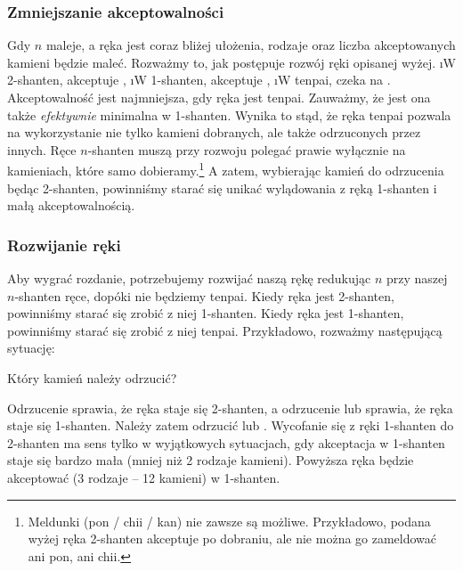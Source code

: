 \subsubsection{Zmniejszanie akceptowalności}
Gdy $n$ maleje, a ręka jest coraz bliżej ułożenia, rodzaje oraz liczba akceptowanych kamieni będzie maleć.
Rozważmy to, jak postępuje rozwój ręki opisanej wyżej.
\bi
\i W 2-{\jap shanten}, akceptuje ,
\i W 1-{\jap shanten}, akceptuje ,
\i W {\jap tenpai}, czeka na .
\ei
Akceptowalność jest najmniejsza, gdy ręka jest {\jap tenpai}.
Zauważmy, że jest ona także \emph{efektywnie} minimalna w 1-{\jap shanten}.
Wynika to stąd, że ręka {\jap tenpai} pozwala na wykorzystanie nie tylko kamieni dobranych, ale także odrzuconych przez innych.
Ręce $n$-{\jap shanten} muszą przy rozwoju polegać prawie wyłącznie na kamieniach, które samo dobieramy.\footnote{Meldunki ({\jap pon} / {\jap chii} / {\jap kan}) nie zawsze są możliwe. Przykładowo, podana wyżej ręka 2-{\jap shanten} akceptuje  po dobraniu, ale nie można go zameldować ani {\jap pon}, ani {\jap chii}.}
A zatem, wybierając kamień do odrzucenia będąc 2-{\jap shanten}, powinniśmy starać się unikać wylądowania z ręką 1-{\jap shanten} i małą akceptowalnością.

\subsubsection{Rozwijanie ręki}

Aby wygrać rozdanie, potrzebujemy rozwijać naszą rękę redukując $n$ przy naszej $n$-{\jap shanten} ręce, dopóki nie będziemy {\jap tenpai}.
Kiedy ręka jest 2-{\jap shanten}, powinniśmy starać się zrobić z niej 1-{\jap shanten}.
Kiedy ręka jest 1-{\jap shanten}, powinniśmy starać się zrobić z niej {\jap tenpai}.
Przykładowo, rozważmy następującą sytuację:
\begin{screen}
\vspace{-10pt}Który kamień należy odrzucić?\vspace{-5pt}
\end{screen}
\noindent
Odrzucenie  sprawia, że ręka staje się 2-{\jap shanten}, a odrzucenie  lub  sprawia, że ręka staje się 1-{\jap shanten}.
Należy zatem odrzucić  lub .
Wycofanie się z ręki 1-{\jap shanten} do 2-{\jap shanten} ma sens tylko w wyjątkowych sytuacjach, gdy akceptacja w 1-{\jap shanten} staje się bardzo mała (mniej niż 2 rodzaje kamieni).
Powyższa ręka będzie akceptować  (3 rodzaje -- 12 kamieni) w 1-{\jap shanten}.

